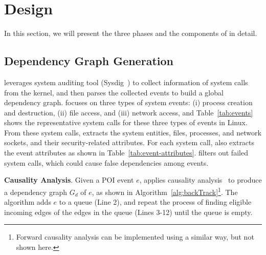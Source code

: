 \section{\tool Design}
\label{sec:approach}
In this section, we will present the three phases and the components of \tool in detail.


\subsection{Dependency Graph Generation}
\label{subsec:logParsing}
\tool leverages system auditing tool (\eg Sysdig~\cite{sysdig}) to collect information of system calls from the kernel, and then parses the collected events to build a global dependency graph.
\tool focuses on three types of system events: (i) process creation and destruction, (ii) file access, and (iii) network access,
and Table~\ref{tab:events} shows the representative system calls for these three types of events in Linux.
From these system calls, \tool extracts the system entities, files, processes, and network sockets, and their security-related attributes.
For each system call, \tool also extracts the event attributes as shown in Table~\ref{tab:event-attributes}.
\tool filters out failed system calls, which could cause false dependencies among events.


\noindent\textbf{Causality Analysis}.
Given a POI event $e$, \tool applies causality analysis~\cite{backtracking} to produce a dependency graph $G_d$ of $e$, as shown in Algorithm~\ref{alg:backTrack}\footnote{Forward causality analysis can be implemented using a similar way, but not shown here.}.
The algorithm adds $e$ to a queue (Line 2), and repeat the process of finding eligible incoming edges of the edges in the queue (Lines 3-12) until the queue is empty.

